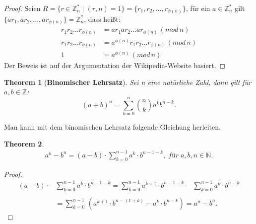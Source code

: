 \documentclass[12pt,oneside]{article}
\newtheorem{theorem}{Theorem}[section]
\theoremstyle{remark}
\theoremstyle{definition}
\begin{document}
\begin{proof}
    
Seien $R =\{ r \in \mathbb{Z}_{n}^{*} \mid (r,n) = 1 \} =  \{r_{1}, r_{2},...,r_{\phi(n)} \}$, für ein $a \in \mathbb{Z}_{n}^{*}$ gilt $\{ar_{1},ar_{2},...,ar_{\phi(n)}\} = \mathbb{Z}_{n}^{*}$, dass heißt:\newline\newline
\begin{align*}
    r_{1}r_{2} \dots r_{\phi(n)} &= ar_{1}ar_{2} \dots ar_{\phi(n)} \, (mod \, n)\\
    r_{1}r_{2} \dots r_{\phi(n)} &= a^{\phi(n)} r_{1}r_{2} \dots r_{\phi(n)} \, (mod \, n) \\
    1 &= a^{\phi(n)} \, (mod \, n)
\end{align*}
Der Beweis ist auf der Argumentation der Wikipedia-Website basiert\cite{eulerthm}. 
\end{proof}

\smallskip

\begin{theorem}[\textbf{Binomischer Lehrsatz}]\label{Th_3}
Sei n eine natürliche Zahl, dann gilt für $a,b \in \mathbb{Z}$:\newline\newline
 \begin{equation}
     (a + b)^n  = \sum_{k=0}^n {n \choose k} a^k b^{n-k}.
 \end{equation}
\end{theorem}

\smallskip

Man kann mit dem binomischen Lehrsatz folgende Gleichung herleiten.\newline

\begin{theorem}\label{funny_id}
\begin{align*}
a^{n} - b^n = (a - b) \cdot \sum_{k = 0}^{n - 1} a^{k} \cdot  b^{n - 1 - k}, \; für \; a,b,n \in \mathbb{N}.
\end{align*} 
\end{theorem}

\begin{proof}
\begin{align*}
(a - b) \cdot &\sum_{k = 0}^{n - 1} a^{k} \cdot  b^{n - 1 - k} = \sum_{k = 0}^{n - 1} a^{k + 1}\cdot b^{n - 1 - k} - \sum_{k = 0}^{n - 1} a^k \cdot b^{n - k} \\
\\
&= \sum_{k = 0}^{n - 1} \, (a^{k + 1}\cdot b^{n - (1 + k)} -a^k \cdot b^{n - k}) = a^n - b^n.
\end{align*}
\end{proof}
\end{document}
